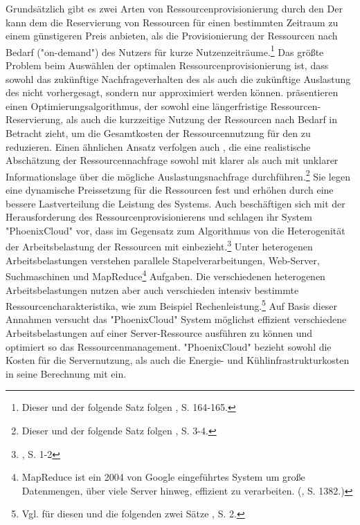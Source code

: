 \newline
Grundsätzlich gibt es zwei Arten von Ressourcenprovisionierung durch den \CSPDot Der \CSP kann dem \CSU die Reservierung von Ressourcen für einen bestimmten Zeitraum zu einem günstigeren Preis anbieten, als die Provisionierung der Ressourcen nach Bedarf ("on-demand") des Nutzers für kurze Nutzenzeiträume.\footnote{Dieser und der folgende Satz folgen \cite{Chaisiri.2012}, S. 164-165.} 
Das größte Problem beim Auswählen der optimalen Ressourcenprovisionierung ist, dass sowohl das zukünftige Nachfrageverhalten des \CSUsComma als auch die zukünftige Auslastung des \CSs nicht vorhergesagt, sondern nur approximiert werden können.
\cite{Chaisiri.2012} präsentieren einen Optimierungsalgorithmus, der sowohl eine längerfristige Ressourcen-Reservierung, als auch die kurzzeitige Nutzung der Ressourcen nach Bedarf in Betracht zieht, um die Gesamtkosten der Ressourcennutzung für den \CSU zu reduzieren.
\newline
Einen ähnlichen Ansatz verfolgen auch \cite{Pueschel.2012}, die eine realistische Abschätzung der Ressourcennachfrage sowohl mit klarer als auch mit unklarer Informationslage über die mögliche Auslastungsnachfrage durchführen.\footnote{Dieser und der folgende Satz folgen \cite{Pueschel.2012}, S. 3-4.} 
Sie legen eine dynamische Preissetzung für die Ressourcen fest und  erhöhen durch eine bessere Lastverteilung die Leistung des Systems.
\newline
Auch \cite{Zhan.2012} beschäftigen sich mit der Herausforderung des Ressourcenprovisionierens und schlagen ihr System "PhoenixCloud" vor, dass im Gegensatz zum Algorithmus von \cite{Chaisiri.2012} die Heterogenität der Arbeitsbelastung der Ressourcen mit einbezieht.\footnote{\cite{Zhan.2012}, S. 1-2} 
Unter heterogenen Arbeitsbelastungen verstehen \cite{Zhan.2012} parallele Stapelverarbeitungen, Web-Server, Suchmaschinen und MapReduce\footnote{MapReduce ist ein 2004 von Google eingeführtes System um große Datenmengen, über viele Server hinweg, effizient zu verarbeiten. (\cite{Marozzo.2012}, S. 1382.)} Aufgaben. 
Die verschiedenen heterogenen Arbeitsbelastungen nutzen aber auch verschieden intensiv bestimmte Ressourcencharakteristika, wie zum Beispiel Rechenleistung.\footnote{Vgl. für diesen und die folgenden zwei Sätze \cite{Zhan.2012}, S. 2.}
Auf Basis dieser Annahmen versucht das "PhoenixCloud" System möglichst effizient verschiedene Arbeitsbelastungen auf einer Server-Ressource ausführen zu können und optimiert so das Ressourcenmanagement. "PhoenixCloud" bezieht sowohl die Kosten für die Servernutzung, als auch die Energie- und Kühlinfrastrukturkosten in seine Berechnung mit ein.
